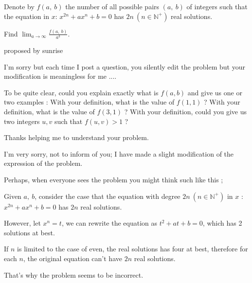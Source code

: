 \begin{solution}
	\begin{tcolorbox}Denote by $f(a,\ b)$ the number of all possible pairs $(a,\ b)$ of integers such that the equation in $x$: $x^{2n}+ax^n+b=0$ has $2n\ (n\in\mathbb{N^{+}})$ real solutions.

Find $\lim_{a\to\infty}\frac{f(a,\ b)}{a^3}.$

proposed by sunrise\end{tcolorbox}
I'm sorry but each time I post a question, you silently edit the problem but your modification is meaningless for me ....

To be quite clear, could you explain exactly what is $f(a,b)$ and give us one or two examples :
With your definition, what is the value of $f(1,1)$ ?
With your definition, what is the value of $f(3,1)$ ?
With your definition, could you give us two integers $u,v$ such that $f(u,v)>1$ ?

Thanks helping me to understand your problem.
\end{solution}



\begin{solution}
	I'm very sorry, not to inform of you; I have made a slight modification of the expression of the problem.

Perhaps, when everyone sees the problem you might think such like this ;

Given $a,\ b$, consider the case that the equation with degree $2n\ (n\in{\mathbb{N^{+}}})$ in $x$ : $x^{2n}+ax^n+b=0$ has $2n$ real solutions.

However, let $x^{n}=t$, we can rewrite the equation as $t^2+at+b=0$, which has 2 solutions at best.

If $n$ is limited to the case of even, the real solutions has four at best, therefore for each $n$, the original equation can't have $2n$ real solutions.

That's why the problem seems to be incorrect.
\end{solution}



